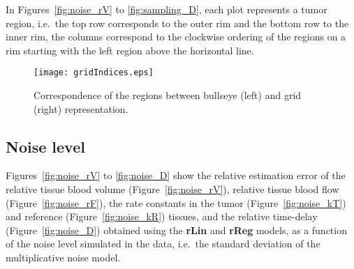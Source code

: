 In Figures~\ref{fig:noise_rV} to \ref{fig:sampling_D}, each plot represents a tumor region, i.e.~the top row corresponds to the outer rim and the bottom row to the inner rim, the columns correspond to the clockwise ordering of the regions on a rim starting with the left region above the horizontal line.

\begin{figure}
\texttt{[image: gridIndices.eps]}
\caption{Correspondence of the regions between bullseye (left) and grid (right) representation.}
\label{fig:gridIndices}
\end{figure}
\FloatBarrier

\subsection{Noise level}
Figures~\ref{fig:noise_rV} to \ref{fig:noise_D} show the relative estimation error of the relative tissue blood volume (Figure~\ref{fig:noise_rV}), relative tissue blood flow (Figure~\ref{fig:noise_rF}), the rate constants in the tumor (Figure~\ref{fig:noise_kT}) and reference (Figure~\ref{fig:noise_kR}) tissues, and the relative time-delay (Figure~\ref{fig:noise_D}) obtained using the \textbf{rLin} and \textbf{rReg} models, as a function of the noise level simulated in the data, i.e.~the standard deviation of the multiplicative noise model.


